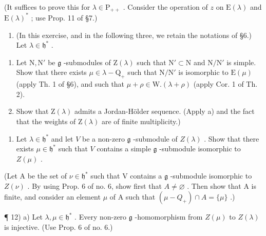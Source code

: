 (It suffices to prove this for \(\lambda \in \mathrm{P}_{++}\) . Consider the operation of \(z\) on \(\mathrm{E}(\lambda)\) and \(\mathrm{E}(\lambda)^*\) ; use Prop. 11 of §7.)

\begin{enumerate}
\def\labelenumi{\arabic{enumi})}
\setcounter{enumi}{9}
\tightlist
\item
  (In this exercise, and in the following three, we retain the notations of §6.) Let \(\lambda \in \mathfrak{h}^*\) .
\end{enumerate}

\begin{enumerate}
\def\labelenumi{\alph{enumi})}
\tightlist
\item
  Let \(\mathrm{N}, \mathrm{N}'\) be \(\mathfrak{g}\) -submodules of \(\mathrm{Z}(\lambda)\) such that \(\mathrm{N}' \subset \mathrm{N}\) and \(\mathrm{N} / \mathrm{N}'\) is simple. Show that there exists \(\mu \in \lambda - \mathrm{Q}_+\) such that \(\mathrm{N} / \mathrm{N}'\) is isomorphic to \(\mathrm{E}(\mu)\) (apply Th. 1 of §6), and such that \(\mu + \rho \in \mathrm{W}.(\lambda + \rho)\) (apply Cor. 1 of Th. 2).
\item
  Show that \(\mathrm{Z}(\lambda)\) admits a Jordan-Hölder sequence. (Apply a) and the fact that the weights of \(\mathrm{Z}(\lambda)\) are of finite multiplicity.)
\end{enumerate}

\begin{enumerate}
\def\labelenumi{\arabic{enumi})}
\setcounter{enumi}{10}
\tightlist
\item
  Let \(\lambda \in \mathfrak{h}^*\) and let \(V\) be a non-zero \(\mathfrak{g}\) -submodule of \(Z(\lambda)\) . Show that there exists \(\mu \in \mathfrak{h}^*\) such that \(V\) contains a simple \(\mathfrak{g}\) -submodule isomorphic to \(Z(\mu)\) .
\end{enumerate}

(Let A be the set of \(\nu \in \mathfrak{h}^*\) such that V contains a \(\mathfrak{g}\) -submodule isomorphic to \(Z(\nu)\) . By using Prop. 6 of no. 6, show first that \(A \neq \varnothing\) . Then show that A is finite, and consider an element \(\mu\) of A such that \((\mu - Q_{+}) \cap A = \{\mu\}\) .)

¶ 12) a) Let \(\lambda, \mu \in \mathfrak{h}^*\) . Every non-zero \(\mathfrak{g}\) -homomorphism from \(Z(\mu)\) to \(Z(\lambda)\) is injective. (Use Prop. 6 of no. 6.)


